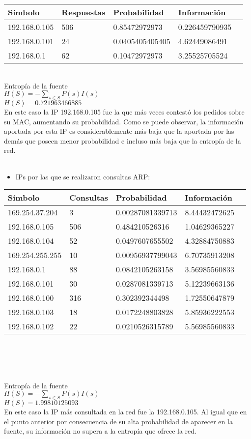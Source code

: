 \newpage

\begin{tabular}{|l|l|l|l|l|}
  \hline
  S\'imbolo & Respuestas & Probabilidad & Informaci\'on \\
  \hline
  192.168.0.105 & 506 & 0.85472972973 & 0.226459790935 \\
  \hline
  192.168.0.101 & 24 & 0.0405405405405 & 4.62449086491 \\
  \hline
  192.168.0.1 & 62 & 0.10472972973 & 3.25525705524\\
  \hline
\end{tabular}\\
 
Entrop\'ia de la fuente\\
$H(S) = -\sum_{s \in S} P(s) I(s)$\\
$H(S) = 0.721963466885$\\

En este caso la IP 192.168.0.105 fue la que m\'as veces contest\'o los pedidos sobre su MAC, aumentando su probabilidad. Como se puede observar, la informaci\'on
aportada por esta IP es considerablemente m\'as baja que la aportada por las dem\'as que poseen menor probabilidad e incluso m\'as baja que la entrop\'ia de la red.\\\\

\newpage
\begin{itemize}
 \item IPs por las que se realizaron consultas ARP:\\
\end{itemize}

\begin{tabular}{|l|l|l|l|l|}
  \hline
  S\'imbolo & Consultas & Probabilidad & Informaci\'on \\
  \hline
  169.254.37.204 & 3 & 0.00287081339713 & 8.44432472625\\
  \hline
  192.168.0.105 & 506 & 0.484210526316 & 1.04629365227\\
  \hline
  192.168.0.104 & 52 & 0.0497607655502 & 4.32884750883\\
  \hline
  169.254.255.255 & 10 & 0.00956937799043 & 6.70735913208\\
  \hline
  192.168.0.1 & 88 & 0.0842105263158 & 3.56985560833\\
  \hline
  192.168.0.101 & 30 & 0.0287081339713 & 5.12239663136\\
  \hline
  192.168.0.100 & 316 & 0.302392344498 & 1.72550647879\\
  \hline
  192.168.0.103 & 18 & 0.0172248803828 & 5.85936222553\\
  \hline
  192.168.0.102 & 22 & 0.0210526315789 & 5.56985560833\\
  \hline
\end{tabular}\\
\\ \ \\ \ \\ 
Entrop\'ia de la fuente\\
$H(S) = -\sum_{s \in S} P(s) I(s)$\\
$H(S) = 1.99810125093$\\

En este caso la IP m\'as consultada en la red fue la 192.168.0.105. Al igual que en el punto anterior por consecuencia de su alta probabilidad de aparecer en la fuente, su informaci\'on no supera a la entrop\'ia que ofrece la red.


